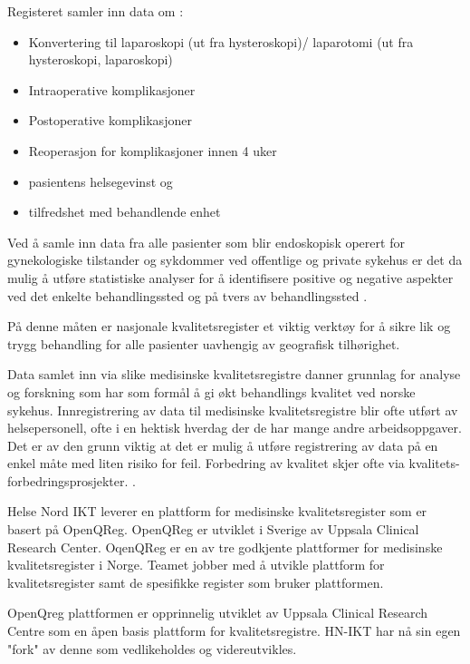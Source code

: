 Registeret samler inn data om \cite{1-kvalitetsregistre.no}:

\begin{itemize}    
    \item Konvertering til laparoskopi (ut fra hysteroskopi)/ laparotomi (ut fra hysteroskopi, laparoskopi)
    \item Intraoperative komplikasjoner
    \item Postoperative komplikasjoner
    \item Reoperasjon for komplikasjoner innen 4 uker
    \item pasientens helsegevinst og 
    \item tilfredshet med behandlende enhet
\end{itemize}

Ved å samle inn data fra alle pasienter som blir endoskopisk operert for gynekologiske tilstander og sykdommer ved offentlige og private sykehus er det da mulig å utføre statistiske analyser for å identifisere positive og negative aspekter ved det enkelte behandlingssted og på tvers av behandlingssted \cite{1-kvalitetsregistre.no}.  

På denne måten er nasjonale kvalitetsregister et viktig verktøy for å sikre lik og trygg behandling for alle pasienter uavhengig av geografisk tilhørighet.

Data samlet inn via slike medisinske kvalitetsregistre danner grunnlag for analyse og forskning som har som formål å gi økt behandlings kvalitet
ved norske sykehus. Innregistrering av data til medisinske kvalitetsregistre blir ofte utført av helsepersonell, ofte i en hektisk hverdag der de har
mange andre arbeidsoppgaver. Det er av den grunn viktig at det er mulig å utføre registrering av data på en enkel måte med liten risiko for feil.
Forbedring av kvalitet skjer ofte via kvalitets-forbedringsprosjekter. \cite{1-kvalitetsforbedring}.  

Helse Nord IKT leverer en plattform for medisinske kvalitetsregister som er basert på OpenQReg. OpenQReg er utviklet i Sverige av Uppsala Clinical Research Center.\cite{Jernberg1617} OqenQReg er en av tre godkjente plattformer for medisinske kvalitetsregister i Norge.
Teamet jobber med å utvikle plattform for kvalitetsregister samt de spesifikke register som bruker plattformen.\cite{1-norsk-helsenett}  

OpenQreg plattformen er opprinnelig utviklet av Uppsala Clinical Research Centre som en åpen basis plattform for kvalitetsregistre. HN-IKT har nå sin egen "fork" av denne som vedlikeholdes og videreutvikles.

